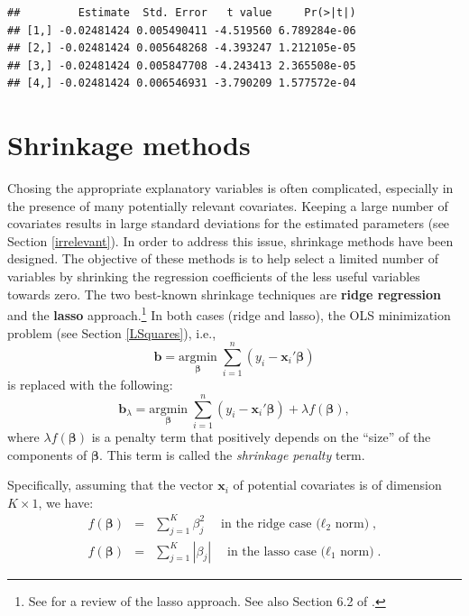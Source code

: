 \documentclass[
  12pt,
]{book}
\theoremstyle{definition}
\theoremstyle{definition}
\theoremstyle{definition}
\theoremstyle{definition}
\theoremstyle{remark}
\begin{document}
\begin{verbatim}
##         Estimate  Std. Error   t value     Pr(>|t|)
## [1,] -0.02481424 0.005490411 -4.519560 6.789284e-06
## [2,] -0.02481424 0.005648268 -4.393247 1.212105e-05
## [3,] -0.02481424 0.005847708 -4.243413 2.365508e-05
## [4,] -0.02481424 0.006546931 -3.790209 1.577572e-04
\end{verbatim}

\hypertarget{shrinkage-methods}{%
\section{Shrinkage methods}\label{shrinkage-methods}}

Chosing the appropriate explanatory variables is often complicated, especially in the presence of many potentially relevant covariates. Keeping a large number of covariates results in large standard deviations for the estimated parameters (see Section \ref{irrelevant}). In order to address this issue, shrinkage methods have been designed. The objective of these methods is to help select a limited number of variables by shrinking the regression coefficients of the less useful variables towards zero. The two best-known shrinkage techniques are \textbf{ridge regression} and the \textbf{lasso} approach.\footnote{See \citet{Tibshirani_2011} for a review of the lasso approach. See also Section 6.2 of \citet{James2013}.} In both cases (ridge and lasso), the OLS minimization problem (see Section \ref{LSquares}), i.e.,
\begin{equation}
\mathbf{b} = \underset{\boldsymbol\beta}{\mbox{argmin}}\; \sum_{i=1}^n(y_i - \mathbf{x}_i'\boldsymbol\beta)
\end{equation}
is replaced with the following:
\begin{equation}
\mathbf{b}_\lambda = \underset{\boldsymbol\beta}{\mbox{argmin}}\; \sum_{i=1}^n(y_i - \mathbf{x}_i'\boldsymbol\beta) + \lambda f(\boldsymbol\beta),\label{eq:minLasso}
\end{equation}
where \(\lambda f(\boldsymbol\beta)\) is a penalty term that positively depends on the ``size'' of the components of \(\boldsymbol\beta\). This term is called the \emph{shrinkage penalty} term.

Specifically, assuming that the vector \(\mathbf{x}_i\) of potential covariates is of dimension \(K \times 1\), we have:
\begin{eqnarray*}
f(\boldsymbol\beta) & = & \sum_{j=1}^K \beta_j^2 \quad \mbox{in the ridge case ($\ell_2$ norm)},\\
f(\boldsymbol\beta) & = & \sum_{j=1}^K |\beta_j| \quad \mbox{in the lasso case ($\ell_1$ norm)}.
\end{eqnarray*}
\end{document}
